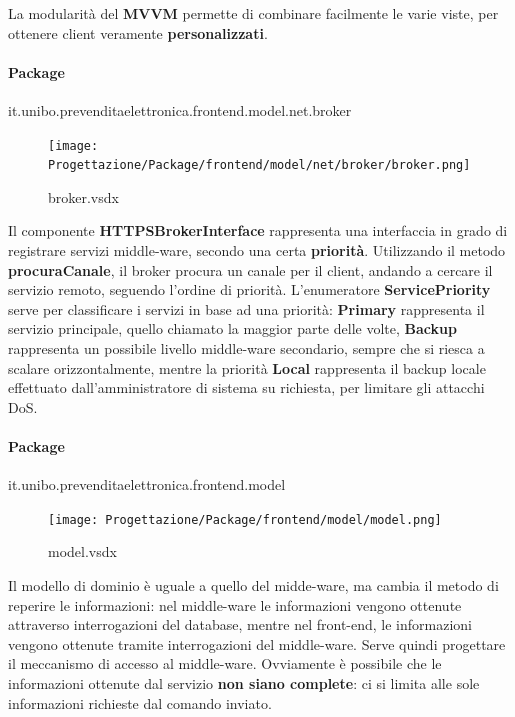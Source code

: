 \documentclass[a4paper]{article}
\begin{document}
La modularità del \textbf{MVVM} permette di combinare facilmente le varie viste, per ottenere client veramente \textbf{personalizzati}.

\paragraph{Package}it.unibo.prevenditaelettronica.frontend.model.net.broker


\begin{figure}[H]
    \texttt{[image: Progettazione/Package/frontend/model/net/broker/broker.png]}
    \centering
    \caption{broker.vsdx}
\end{figure}

Il componente \textbf{HTTPSBrokerInterface} rappresenta una interfaccia in grado di registrare servizi middle-ware, secondo una certa \textbf{priorità}. Utilizzando il metodo \textbf{procuraCanale}, il broker procura un canale per il client, andando a cercare il servizio remoto, seguendo l'ordine di priorità. L'enumeratore \textbf{ServicePriority} serve per classificare i servizi in base ad una priorità: \textbf{Primary} rappresenta il servizio principale, quello chiamato la maggior parte delle volte, \textbf{Backup} rappresenta un possibile livello middle-ware secondario, sempre che si riesca a scalare orizzontalmente, mentre la priorità \textbf{Local} rappresenta il backup locale effettuato dall'amministratore di sistema su richiesta, per limitare gli attacchi DoS.

\newpage

\paragraph{Package} it.unibo.prevenditaelettronica.frontend.model

\begin{figure}[H]
    \texttt{[image: Progettazione/Package/frontend/model/model.png]}
    \centering
    \caption{model.vsdx}
\end{figure}

Il modello di dominio è uguale a quello del midde-ware, ma cambia il metodo di reperire le informazioni: nel middle-ware le informazioni vengono ottenute attraverso interrogazioni del database, mentre nel front-end, le informazioni vengono ottenute tramite interrogazioni del middle-ware. Serve quindi progettare il meccanismo di accesso al middle-ware. Ovviamente è possibile che le informazioni ottenute dal servizio \textbf{non siano complete}: ci si limita alle sole informazioni richieste dal comando inviato.
\end{document}
